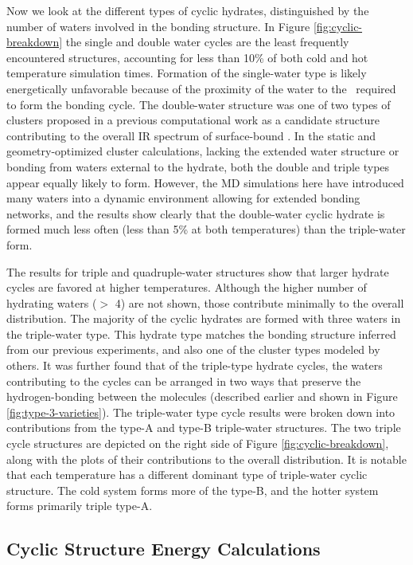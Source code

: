 Now we look at the different types of cyclic hydrates, distinguished by the number of waters involved in the bonding structure. In Figure \ref{fig:cyclic-breakdown} the single and double water cycles are the least frequently encountered structures, accounting for less than 10\% of both cold and hot temperature simulation times. Formation of the single-water type is likely energetically unfavorable because of the proximity of the water to the \suldiox~required to form the bonding cycle. The double-water structure was one of two types of clusters proposed in a previous computational work as a candidate structure contributing to the overall IR spectrum of surface-bound \suldiox.\cite{Baer2010} In the static and geometry-optimized cluster calculations, lacking the extended water structure or bonding from waters external to the hydrate, both the double and triple types appear equally likely to form. However, the MD simulations here have introduced many waters into a dynamic environment allowing for extended bonding networks, and the results show clearly that the double-water cyclic hydrate is formed much less often (less than 5\% at both temperatures) than the triple-water form.

The results for triple and quadruple-water structures show that larger hydrate cycles are favored at higher temperatures. Although the higher number of hydrating waters ($>$ 4) are not shown, those contribute minimally to the overall distribution. The majority of the cyclic hydrates are formed with three waters in the triple-water type. This hydrate type matches the bonding structure inferred from our previous experiments, and also one of the cluster types modeled by others.\cite{Tarbuck2005,Tarbuck2006,Baer2010} It was further found that of the triple-type hydrate cycles, the waters contributing to the cycles can be arranged in two ways that preserve the hydrogen-bonding between the molecules (described earlier and shown in Figure \ref{fig:type-3-varieties}). The triple-water type cycle results were broken down into contributions from the type-A and type-B triple-water structures. The two triple cycle structures are depicted on the right side of Figure \ref{fig:cyclic-breakdown}, along with the plots of their contributions to the overall distribution. It is notable that each temperature has a different dominant type of triple-water cyclic structure. The cold system forms more of the type-B, and the hotter system forms primarily triple type-A.

\subsection {Cyclic Structure Energy Calculations}

